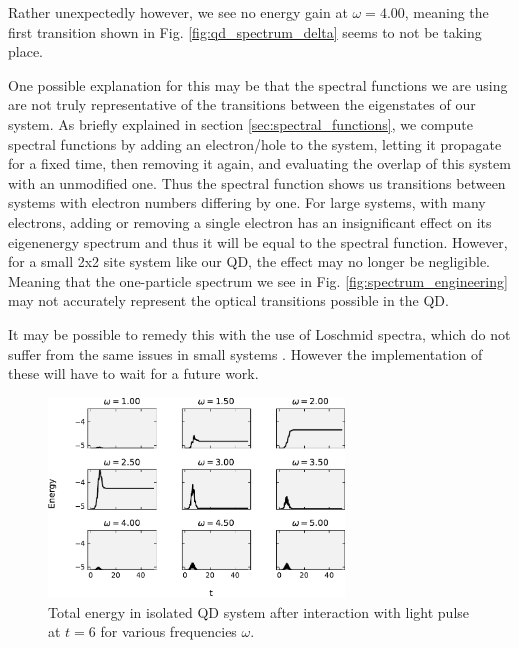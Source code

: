 \medskip

Rather unexpectedly however, we see no energy gain at $\omega = 4.00$, meaning the first transition shown in Fig. \ref{fig:qd_spectrum_delta} seems to not be taking place.

\medskip

One possible explanation for this may be that the spectral functions we are using are not truly representative of the transitions between the eigenstates of our system. As briefly explained in section \ref{sec:spectral_functions}, we compute spectral functions by adding an electron/hole to the system, letting it propagate for a fixed time, then removing it again, and evaluating the overlap of this system with an unmodified one. Thus the spectral function shows us transitions between systems with electron numbers differing by one. For large systems, with many electrons, adding or removing a single electron has an insignificant effect on its eigenenergy spectrum and thus it will be equal to the spectral function. However, for a small 2x2 site system like our QD, the effect may no longer be negligible. Meaning that the one-particle spectrum we see in Fig. \ref{fig:spectrum_engineering} may not accurately represent the optical transitions possible in the QD.

\medskip
It may be possible to remedy this with the use of Loschmid spectra, which do not suffer from the same issues in small systems \cite{loschmidt}. However the implementation of these will have to wait for a future work. 

\medskip

\begin{figure}[!hbt]
    \centering
    \includegraphics[width=0.7\textwidth]{graph/isolated_QD_freqsweep.pdf}
    \caption{Total energy in isolated QD system after interaction with light pulse at $t=6$ for various frequencies $\omega$.}
    \label{fig:qd_9_total_energy}
\end{figure}